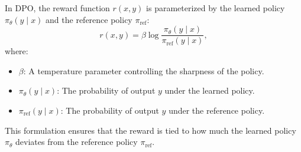 In DPO, the reward function \( r(x, y) \) is parameterized by the learned policy \( \pi_\theta(y \mid x) \) and the reference policy $\pi_{\text{ref}}$:
\[
r(x, y) = \beta \log \frac{\pi_{\theta}(y \mid x)}{\pi_{\text{ref}}(y \mid x)},
\]
where:
\begin{itemize}
	\item \( \beta \): A temperature parameter controlling the sharpness of the policy.
	\item \( \pi_{\theta}(y \mid x) \): The probability of output \( y \) under the learned policy.
	\item \( \pi_{\text{ref}}(y \mid x) \): The probability of output \( y \) under the reference policy.
\end{itemize}
This formulation ensures that the reward is tied to how much the learned policy \( \pi_{\theta} \) deviates from the reference policy \( \pi_{\text{ref}} \).

